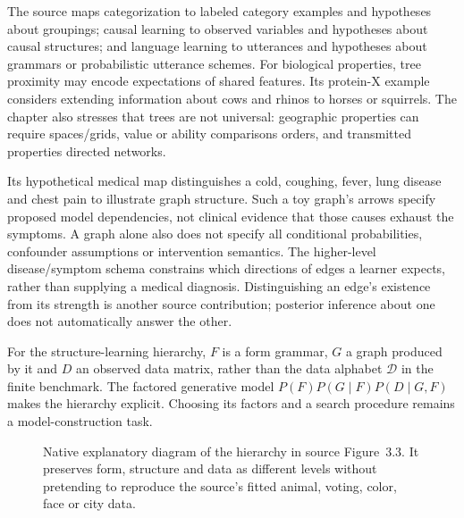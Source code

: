 The source maps categorization to labeled category examples and hypotheses
about groupings; causal learning to observed variables and hypotheses about
causal structures; and language learning to utterances and hypotheses about
grammars or probabilistic utterance schemes. For biological properties,
tree proximity may encode expectations of shared features. Its protein-X
example considers extending information about cows and rhinos to horses or
squirrels. The chapter also stresses that trees are not universal:
geographic properties can require spaces/grids, value or ability comparisons
orders, and transmitted properties directed networks.

Its hypothetical medical map distinguishes a cold, coughing, fever, lung
disease and chest pain to illustrate graph structure. Such a toy graph's
arrows specify proposed model dependencies, not clinical evidence that
those causes exhaust the symptoms. A graph alone also does not specify
all conditional probabilities, confounder assumptions or intervention
semantics. The higher-level disease/symptom schema constrains which
directions of edges a learner expects, rather than supplying a medical
diagnosis. Distinguishing an edge's existence from its strength is another
source contribution; posterior inference about one does not automatically
answer the other.

For the structure-learning hierarchy, \(F\) is a form grammar, \(G\)
a graph produced by it and \(D\) an observed data matrix, rather than
the data alphabet \(\mathcal D\) in the finite benchmark. The factored
generative model \(P(F)P(G\mid F)P(D\mid G,F)\) makes the hierarchy
explicit. Choosing its factors and a search procedure remains a
model-construction task.

\begin{figure}[htbp]
\centering
{}
\caption{Native explanatory diagram of the hierarchy in source Figure~3.3.
It preserves form, structure and data as different levels without pretending
to reproduce the source's fitted animal, voting, color, face or city data.}
\label{fig:p19-bci-hierarchy}
\end{figure}

